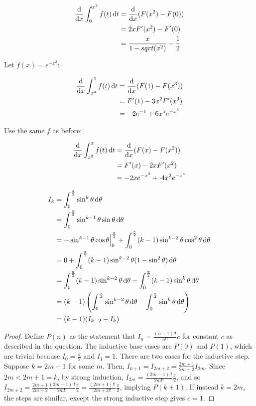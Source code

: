 \begin{align*}
  \frac{\mathop{}\!\mathrm{d}}{\mathop{}\!\mathrm{d} x} \int_0^{x^2} f(t) \mathop{}\!\mathrm{d} t &= \frac{\mathop{}\!\mathrm{d}}{\mathop{}\!\mathrm{d} x} (F(x^2) - F(0)) \\
  &= 2x F^{\prime}(x^2) - F^{\prime}(0) \\
  &= \frac{x}{1 - sqrt(x^2)} - \frac{1}{2}
\end{align*}

 Let $f(x) = e^{-x^2}$:

\begin{align*}
  \frac{\mathop{}\!\mathrm{d}}{\mathop{}\!\mathrm{d} x} \int_{x^3}^1 f(t) \mathop{}\!\mathrm{d} t &= \frac{\mathop{}\!\mathrm{d}}{\mathop{}\!\mathrm{d} x} (F(1) - F(x^3)) \\
  &= F^{\prime}(1) - 3x^2 F^{\prime}(x^3) \\
  &= -2 e^{-1} + 6x^5 e^{-x^6}
\end{align*}

 Use the same $f$ as before:

\begin{align*}
  \frac{\mathop{}\!\mathrm{d}}{\mathop{}\!\mathrm{d} x} \int_{x^2}^x f(t) \mathop{}\!\mathrm{d} t &= \frac{\mathop{}\!\mathrm{d}}{\mathop{}\!\mathrm{d} x} (F(x) - F(x^2)) \\
  &= F^{\prime}(x) - 2x F^{\prime}(x^2) \\
  &= -2x e^{-x^2} + \cdot 4x^3 e^{-x^4}
\end{align*}


 \begin{align*}
  I_k &= \int_0^{\frac{\pi}{2}} \sin^k\theta \diff \theta \\
  &= \int_0^{\frac{\pi}{2}} \sin^{k - 1}\theta \sin\theta \diff \theta \\
  &= -\sin^{k - 1}\theta \cos\theta \Big|_0^{\frac{\pi}{2}} + \int_0^{\frac{\pi}{2}} (k - 1) \sin^{k - 2}\theta \cos^2\theta \diff \theta \\
  &= 0 + \int_0^{\frac{\pi}{2}} (k - 1) \sin^{k - 2}\theta (1 - \sin^2\theta) \diff \theta \\
  &= \int_0^{\frac{\pi}{2}} (k - 1) \sin^{k - 2}\theta \diff \theta - \int_0^{\frac{\pi}{2}} (k - 1) \sin^k\theta \diff \theta \\
  &= (k - 1) \left(\int_0^{\frac{\pi}{2}} \sin^{k - 2}\theta \diff \theta - \int_0^{\frac{\pi}{2}} \sin^k\theta \diff \theta\right) \\
  &= (k - 1)(I_{k - 2} - I_k)
\end{align*}

 \begin{proof}
  Define $P(n)$ as the statement that $I_n = \frac{(n - 1)!!}{n!!}c$ for constant $c$ as described in the question. The inductive base cases are $P(0)$ and $P(1)$, which are trivial because $I_0 = \frac{\pi}{2}$ and $I_1 = 1$. There are two cases for the inductive step. Suppose $k = 2m + 1$ for some $m$. Then, $I_{k + 1} = I_{2m + 2} = \frac{2m + 1}{2m + 2}I_{2m}$. Since $2m < 2m + 1 = k$, by strong induction, $I_{2m} = \frac{(2m - 1)!!}{2m!!}\frac{\pi}{2}$, and so $I_{2m + 2} = \frac{2m + 1}{2m + 2}\frac{(2m - 1)!!}{2m!!}\frac{\pi}{2} = \frac{(2m + 1)!!}{2m + 2!!}\frac{\pi}{2}$, implying $P(k + 1)$. If instead $k = 2m$, the steps are similar, except the strong inductive step gives $c = 1$.
\end{proof}

